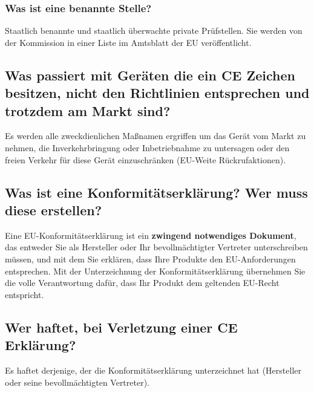 \subsubsection{Was ist eine benannte Stelle?}
Staatlich benannte und staatlich überwachte private Prüfstellen.\p
Sie werden von der Kommission in einer Liste im Amtsblatt der EU veröffentlicht.

\subsection{Was passiert mit Geräten die ein CE Zeichen besitzen, nicht den Richtlinien entsprechen und trotzdem am Markt sind?}
Es werden alle zweckdienlichen Maßnamen ergriffen um das Gerät vom Markt zu nehmen, die Inverkehrbringung oder Inbetriebnahme zu untersagen oder den freien Verkehr für diese Gerät einzuschränken (EU-Weite Rückrufaktionen).

\subsection{Was ist eine Konformitätserklärung? Wer muss diese erstellen?}
Eine EU-Konformitätserklärung ist ein \textbf{zwingend notwendiges Dokument}, das entweder Sie als Hersteller oder Ihr bevollmächtigter Vertreter unterschreiben müssen, und mit dem Sie erklären, dass Ihre Produkte den EU-Anforderungen entsprechen. Mit der Unterzeichnung der Konformitätserklärung übernehmen Sie die volle Verantwortung dafür, dass Ihr Produkt dem geltenden EU-Recht entspricht.

\subsection{Wer haftet, bei Verletzung einer CE Erklärung?}
Es haftet derjenige, der die Konformitätserklärung unterzeichnet hat (Hersteller oder seine bevollmächtigten Vertreter).

\pagebreak